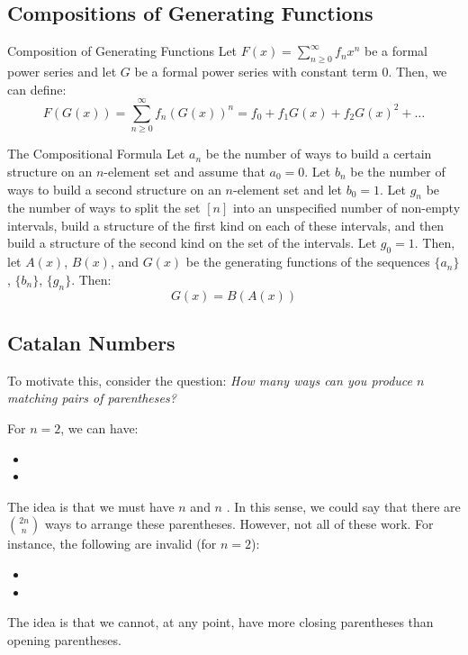 \documentclass[letterpaper]{article}
\begin{document}
\subsection{Compositions of Generating Functions}
\begin{definition}{Composition of Generating Functions}{}
    Let $F(x) = \sum_{n \geq 0}^{\infty} f_n x^n$ be a formal power series and let $G$ be a formal power series with constant term 0. Then, we can define:
    \[F(G(x)) = \sum_{n \geq 0}^{\infty} f_n (G(x))^n = f_0 + f_1 G(x) + f_2 G(x)^2 + \dots\] 
\end{definition} 

\begin{theorem}{The Compositional Formula}{}
    Let $a_n$ be the number of ways to build a certain structure on an $n$-element set and assume that $a_0 = 0$. Let $b_n$ be the number of ways to build a second structure on an $n$-element set and let $b_0 = 1$. Let $g_n$ be the number of ways to split the set $[n]$ into an unspecified number of non-empty intervals, build a structure of the first kind on each of these intervals, and then build a structure of the second kind on the set of the intervals. Let $g_0 = 1$. Then, let $A(x)$, $B(x)$, and $G(x)$ be the generating functions of the sequences $\{a_n\}$, $\{b_n\}$, $\{g_n\}$. Then:
    \[G(x) = B(A(x))\]
\end{theorem}

\subsection{Catalan Numbers}
To motivate this, consider the question: \emph{How many ways can you produce $n$ matching pairs of parentheses?}

\bigskip 

For $n = 2$, we can have:
\begin{itemize}
    \item \code{()()}
    \item \code{(())}
\end{itemize}
The idea is that we must have $n$ \code{(} and $n$ \code{)}. In this sense, we could say that there are $\binom{2n}{n}$ ways to arrange these parentheses. However, not all of these work. For instance, the following are invalid (for $n = 2$):
\begin{itemize}
    \item \code{))((}
    \item \code{)()(}
\end{itemize}
The idea is that we cannot, at any point, have more closing parentheses than opening parentheses. 
\end{document}
